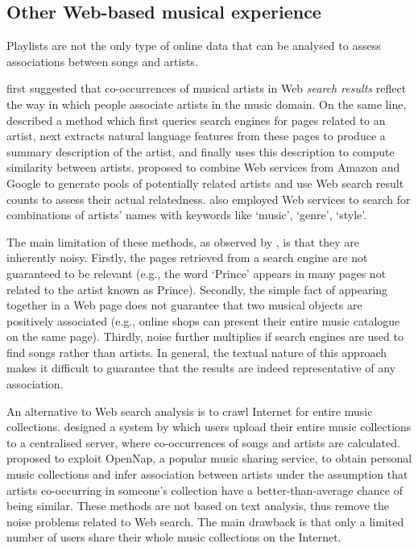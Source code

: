 \subsection{Other Web-based musical experience} %
\label{sub:other_web_based_musical_experience}

Playlists are not the only type of online data that can be analysed to assess associations between songs and artists.

\citet{Cohen00} first suggested that co-occurrences of musical artists in Web \emph{search results} reflect the way in which people associate artists in the music domain.
On the same line, \citet{Whitman02} described a method which first queries search engines for pages related to an artist, next extracts natural language features from these pages to produce a summary description of the artist, and finally uses this description to compute similarity between artists.
\citet{Zadel04} proposed to combine Web services from Amazon and Google to generate pools of potentially related artists and use Web search result counts to assess their actual relatedness.
\citet{Schedl06b} also employed Web services to search for combinations of artists’ names with keywords like `music', `genre', `style'.

The main limitation of these methods, as observed by \citet{Levy07}, is that they are inherently noisy.
Firstly, the pages retrieved from a search engine are not guaranteed to be relevant (e.g., the word `Prince' appears in many pages not related to the artist known as Prince).
Secondly, the simple fact of appearing together in a Web page does not guarantee that two musical objects are positively associated (e.g., online shops can present their entire music catalogue on the same page). %
Thirdly, noise further multiplies if search engines are used to find songs rather than artists.
In general, the textual nature of this approach makes it difficult to guarantee that the results are indeed representative of any association.

An alternative to Web search analysis is to crawl Internet for entire music collections.
\citet{Brown01} designed a system by which users upload their entire music collections to a centralised server, where co-occurrences of songs and artists are calculated.
\citet{Logan03} proposed to exploit OpenNap, a popular music sharing service, to obtain personal music collections and infer association between artists under the assumption that artists co-occurring in someone's collection have a better-than-average chance of being similar. 
%
These methods are not based on text analysis, thus remove the noise problems related to Web search.
The main drawback is that only a limited number of users share their whole music collections on the Internet. %

